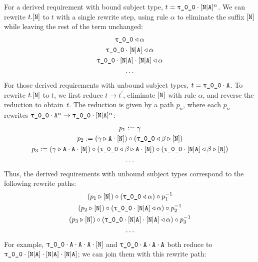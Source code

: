 \documentclass[../generics]{subfiles}
\begin{document}
\begin{example}
For a derived requirement with bound subject type, $t=\rT\cdot\aNA^n$. We can rewrite $t.[\texttt{N}]$ to $t$ with a single rewrite step, using rule $\alpha$ to eliminate the suffix $[\texttt{N}]$ while leaving the rest of the term unchanged:
\begin{gather*}
\rT\WL\alpha\\
\rT\cdot\aNA\WL\alpha\\
\rT\cdot\aNA\cdot\aNA\WL\alpha\\
\ldots
\end{gather*}
For those derived requirements with unbound subject types, $t=\rT\cdot\nA$. To rewrite $t.[\texttt{N}]$ to $t$, we first reduce $t\rightarrow t^\prime$, eliminate $[\texttt{N}]$ with rule $\alpha$, and reverse the reduction to obtain~$t$. The reduction is given by a path $p_n$, where each $p_n$ rewrites $\rT\cdot\nA^n\rightarrow\rT\cdot\aNA^n$:
\begin{gather*}
p_1:=\gamma\\
p_2:=(\gamma\WR\nA\cdot\protosym{N})\circ(\rT\WL\beta\WR\protosym{N})\\
p_3:=(\gamma\WR\nA\cdot\nA\cdot\protosym{N})\circ(\rT\WL\beta\WR\nA\cdot\protosym{N})\circ(\rT\cdot\aNA\WL\beta\WR\protosym{N})\\
\ldots
\end{gather*}
Thus, the derived requirements with unbound subject types correspond to the following rewrite paths:
\begin{gather*}
(p_1\WR\protosym{N})\circ(\rT\WL\alpha)\circ p_1^{-1}\\
(p_2\WR\protosym{N})\circ(\rT\cdot\aNA\WL\alpha)\circ p_2^{-1}\\
(p_3\WR\protosym{N})\circ(\rT\cdot\aNA\cdot\aNA\WL\alpha)\circ p_3^{-1}\\
\ldots
\end{gather*}
For example, $\rT\cdot\nA\cdot\nA\cdot\nA\cdot\protosym{N}$ and $\rT\cdot\nA\cdot\nA\cdot\nA$ both reduce to $\rT\cdot\aNA\cdot\aNA\cdot\aNA$; we can join them with this rewrite path:
\begin{center}
\end{center}


\end{example}
\end{document}
